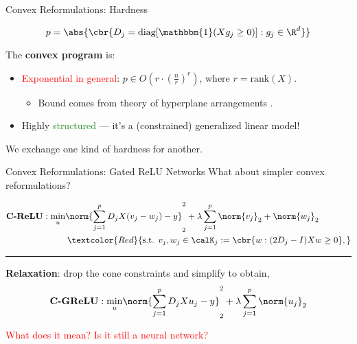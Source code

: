 \documentclass[usenames,dvipsnames,mathserif,notheorems]{beamer}
\newcommand{\horizontalrule}{
	{
			\vspace{-0.5em}
			\center \rule{\textwidth}{0.1em}
			\vspace{-0.2em}
		}
}
\newcommand{\red}[1]{\textcolor{Red}{#1}}
\newcommand{\green}[1]{\textcolor{ForestGreen}{#1}}
\begin{document}
\begin{frame}{Convex Reformulations: Hardness}


	\[
		p = \abs{\cbr{D_j = \text{diag}[\mathbbm{1}(X g_j \geq 0)] : g_j \in \R^d }}
	\]

	\vspace{2em}
	\pause

	The \textbf{convex program} is:
	\vspace{0.5em}
	\begin{itemize}
		\item \red{Exponential in general}: \( p \in O(r \cdot (\frac{n}{r})^r) \),
		      where \( r = \text{rank}(X) \).
		      \vspace{0.25em}
		      \begin{itemize}
			      \item Bound comes from theory of hyperplane arrangements \citep{winder1966partitions}.
		      \end{itemize}
		      \pause

		      \vspace{0.5em}

		\item Highly \green{structured} --- it's a (constrained) generalized linear model!
	\end{itemize}

	\vspace{1em}
	\pause

	\begin{center}
		\Large
		We exchange one kind of hardness for another.
	\end{center}

\end{frame}


\begin{frame}{Convex Reformulations: Gated ReLU Networks}
	What about simpler convex reformulations?

	\[
		\begin{aligned}
			\textbf{C-ReLU}: \min_{u} & \norm{\sum_{j=1}^p D_j X (v_j - w_j) - y}_2^2 +
			\lambda \sum_{j=1}^p \norm{v_j}_2 + \norm{w_j}_2                            \\
			                          & \hspace{0.2em} \red{\text{s.t. }
				v_j, w_j \in \calK_j := \cbr{w : (2D_j - I) X w \geq 0},}
		\end{aligned}
	\]

	\pause
	\horizontalrule

	\textbf{Relaxation}: drop the cone constraints and simplify to obtain,
	\[
		\begin{aligned}
			\textbf{C-GReLU}: \min_{u} & \norm{\sum_{j=1}^p D_j X u_j - y}_2^2 +
			\lambda \sum_{j=1}^p \norm{u_j}_2                                    \\
		\end{aligned}
	\]

	\pause
	\red{What does it mean? Is it still a neural network?}
\end{frame}
\end{document}
